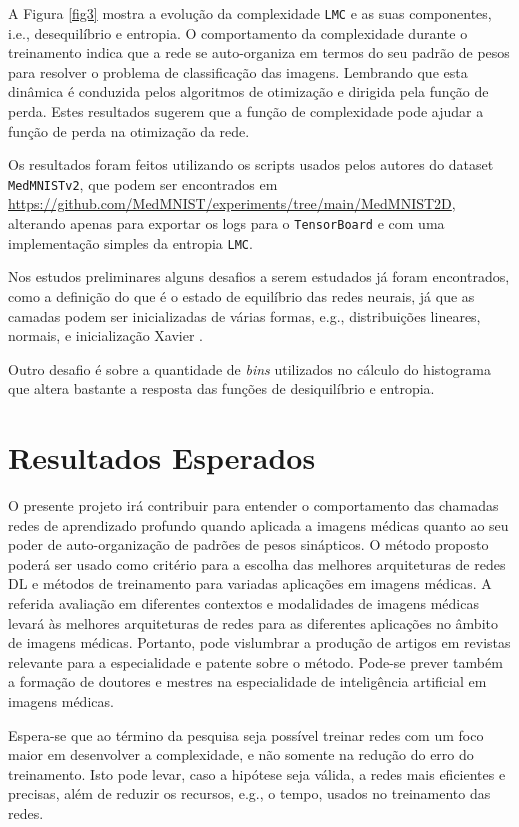 \documentclass[
	12pt,				%
	openany,oneside,
	a4paper,			%
	english,			%
	brazil,				%
	]{abntex2}
\begin{document}
A Figura \ref{fig3} mostra a evolução da complexidade \texttt{LMC} e as suas componentes, i.e., desequilíbrio e entropia. O comportamento da complexidade durante o treinamento indica que a rede se auto-organiza em termos do seu padrão de pesos para resolver o problema de classificação das imagens. Lembrando que esta dinâmica é conduzida pelos algoritmos de otimização e dirigida pela função de perda. Estes resultados sugerem que a função de complexidade pode ajudar a função de perda na otimização da rede.

Os resultados foram feitos utilizando os scripts usados pelos autores do dataset \texttt{MedMNISTv2}, que podem ser encontrados em \url{https://github.com/MedMNIST/experiments/tree/main/MedMNIST2D}, alterando apenas para exportar os logs para o \texttt{TensorBoard} e com uma implementação simples da entropia \texttt{LMC}.

Nos estudos preliminares alguns desafios a serem estudados já foram encontrados, como a definição do que é o estado de equilíbrio das redes neurais, já que as camadas podem ser inicializadas de várias formas, e.g., distribuições lineares, normais, e inicialização Xavier \cite{Glorot2010}.

Outro desafio é sobre a quantidade de \textit{bins} utilizados no cálculo do histograma que altera bastante a resposta das funções de desiquilíbrio e entropia.

\chapter{Resultados Esperados}
O presente projeto irá contribuir para entender o comportamento das chamadas redes de aprendizado profundo quando aplicada a imagens médicas quanto ao seu poder de auto-organização de padrões de pesos sinápticos. O método proposto poderá ser usado como critério para a escolha das melhores arquiteturas de redes DL e métodos de treinamento para variadas aplicações em imagens médicas. A referida avaliação em diferentes contextos e modalidades de imagens médicas levará às melhores arquiteturas de redes para as diferentes aplicações no âmbito de imagens médicas. Portanto, pode vislumbrar a produção de artigos em revistas relevante para a especialidade e patente sobre o método. Pode-se prever também a formação de doutores e mestres na especialidade de inteligência artificial em imagens médicas.

Espera-se que ao término da pesquisa seja possível treinar redes com um foco maior em desenvolver a complexidade, e não somente na redução do erro do treinamento. Isto pode levar, caso a hipótese seja válida, a redes mais eficientes e precisas, além de reduzir os recursos, e.g., o tempo, usados no treinamento das redes.
\end{document}
